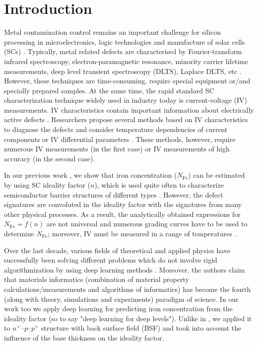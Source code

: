 \documentclass[num-refs]{wiley-article} %
\begin{document}
\section{Introduction}\label{sec:intro}
Metal contamination control remains an important challenge
for silicon processing in microelectronics, logic technologies
and manufacture of solar cells (SCs) \cite{Claers2018,ZHU2016192,FeB:Schmidt,IronSC}.
Typically, metal related defects are  characterised
by Fourier-transform infrared spectroscopy,
electron-paramagnetic resonance,
minority carrier lifetime measurements,
deep level transient spectroscopy (DLTS),
Laplace DLTS, etc \cite{Schroder2006,HowMuchPhysics,LaplDLTS}.
However, these techniques are time-consuming, require special equipment or/and specially prepared samples.
At the same time, the rapid standard SC characterization technique
widely used in industry today is current-voltage (IV) measurements.
IV characteristics contain important information about electrically active defects \cite{HowMuchPhysics,BulyarJAP}.
Researchers propose several methods based on IV characteristics to diagnose
the defects \cite{HowMuchPhysics,BulyarJAP,BulyarSSE,Claeys2019,simoen2007}
and consider temperature dependencies of current components  \cite{Claeys2019,simoen2007}
or IV differential parameters \cite{BulyarJAP,BulyarSSE}.
These methods, however, require numerous IV measurements (in the first case)
or IV measurements of high accuracy (in the second case).

In our previous work \cite{Olikh2019SM},
we show that iron concentration ($N_{\mathrm{Fe}}$) can be estimated
by using SC ideality factor ($n$),
which is used quite often to characterize semiconductor
barrier structures of different types \cite{Heide,Duan,n_CharGaN,n_CharSemic,n_CharPhysRevAppl}.
However, the defect signatures are convoluted in the ideality factor
with the signatures from many other physical processes.
As a result, the analytically obtained expressions for  $N_{\mathrm{Fe}}=f(n)$
are not universal and numerous grading curves have to be used to
determine $N_{\mathrm{Fe}}$;
moreover,   IV must be measured  in a range of temperatures \cite{Olikh2019SM}.

Over the last decade,
various fields of theoretical and applied physics
have successfully been solving different problems
which do not involve rigid algorithmization
by using deep learning methods  \cite{MachLean_RevModPhys,MachLeanJAP,MachLeanPPV}.
Moreover, the authors claim \cite{MI_JAP}  that materials informatics (combination of material property
calculations/measurements and algorithms of informatics)
has become the fourth (along with theory, simulations and experiments) paradigm of science.
In our work too we apply deep learning for predicting iron concentration
from the ideality factor (so to say "deep learning for deep levels").
Unlike in \cite{Olikh2019SM}, we applied it
to $n^+$--$p$--$p^+$ structure with back surface field (BSF)
and took into account the influence of the base thickness on the ideality factor.
\end{document}
